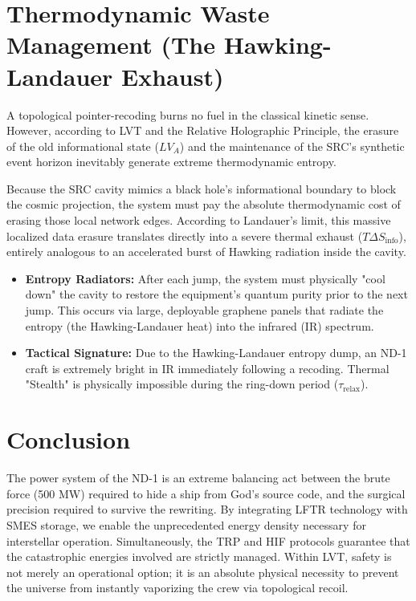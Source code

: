 \documentclass[12pt,a4paper]{article}
\begin{document}
\section{Thermodynamic Waste Management (The Hawking-Landauer Exhaust)}

A topological pointer-recoding burns no fuel in the classical kinetic sense. However, according to LVT and the Relative Holographic Principle, the erasure of the old informational state ($LV_A$) and the maintenance of the SRC's synthetic event horizon inevitably generate extreme thermodynamic entropy.

Because the SRC cavity mimics a black hole's informational boundary to block the cosmic projection, the system must pay the absolute thermodynamic cost of erasing those local network edges. According to Landauer's limit, this massive localized data erasure translates directly into a severe thermal exhaust ($T\Delta S_{\mathrm{info}}$), entirely analogous to an accelerated burst of Hawking radiation inside the cavity.

\begin{itemize}
    \item \textbf{Entropy Radiators:} After each jump, the system must physically "cool down" the cavity to restore the equipment's quantum purity prior to the next jump. This occurs via large, deployable graphene panels that radiate the entropy (the Hawking-Landauer heat) into the infrared (IR) spectrum.
    \item \textbf{Tactical Signature:} Due to the Hawking-Landauer entropy dump, an ND-1 craft is extremely bright in IR immediately following a recoding. Thermal "Stealth" is physically impossible during the ring-down period ($\tau_{\mathrm{relax}}$).
\end{itemize}


\section{Conclusion}
The power system of the ND-1 is an extreme balancing act between the brute force (500 MW) required to hide a ship from God's source code, and the surgical precision required to survive the rewriting. By integrating LFTR technology with SMES storage, we enable the unprecedented energy density necessary for interstellar operation. Simultaneously, the TRP and HIF protocols guarantee that the catastrophic energies involved are strictly managed. Within LVT, safety is not merely an operational option; it is an absolute physical necessity to prevent the universe from instantly vaporizing the crew via topological recoil.
\end{document}
